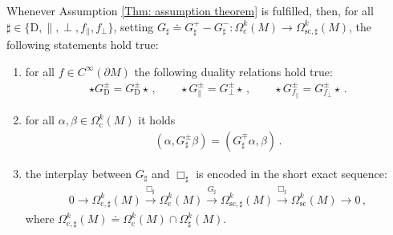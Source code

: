 \begin{proposition}\label{Prop: exact sequence and duality relations}
	Whenever Assumption \ref{Thm: assumption theorem} is fulfilled, then, for all $\sharp\in\lbrace\mathrm{D},\parallel,\perp,f_\parallel,f_\perp\rbrace$, setting $G_\sharp\doteq G_\sharp^+-G_\sharp^-:\Omega^k_{\mathrm{c}}(M)\to\Omega^k_{\mathrm{sc},\sharp}(M)$, the following statements hold true:
	\begin{enumerate}
		\item
		for all $f\in C^\infty(\partial M)$ the following duality relations hold true:
		\begin{align}\label{Eqn: duality between propagators}
		\star G^\pm_{\mathrm{D}}=G^\pm_{\mathrm{D}}\star\,,\qquad
		\star G^\pm_\parallel=
		G^\pm_\perp\star\,,\qquad
		\star G^\pm_{f_\parallel}=
		G^\pm_{f_\perp}\star\,.
		\end{align}
		\item 
		for all $\alpha,\beta\in\Omega_{\mathrm{c}}^k(M)$ it holds
		\begin{align}\label{Eqn: adjont of propagators}
		(\alpha,G^\pm_\sharp\beta)=(G_\sharp^\mp\alpha,\beta)\,.
		\end{align}
		\item
		the interplay between $G_\sharp$ and $\Box_\sharp$ is encoded in the short exact sequence:
		\begin{align}\label{Eqn: short exact sequence_aa}
		0\to\Omega^k_{\mathrm{c},\sharp}(M)\stackrel{\Box_\sharp}{\longrightarrow}
		\Omega^k_{\mathrm{c}}(M)\stackrel{G_\sharp}{\longrightarrow}
		\Omega^k_{\mathrm{sc},\sharp}(M)\stackrel{\Box_\sharp}{\longrightarrow}
		\Omega^k_{\mathrm{sc}}(M)\to 0\,,
		\end{align}
		where $\Omega^k_{\mathrm{c},\sharp}(M)\doteq\Omega_{\mathrm{c}}^k(M)\cap\Omega_\sharp^k(M)$.
	\end{enumerate}
\end{proposition}

